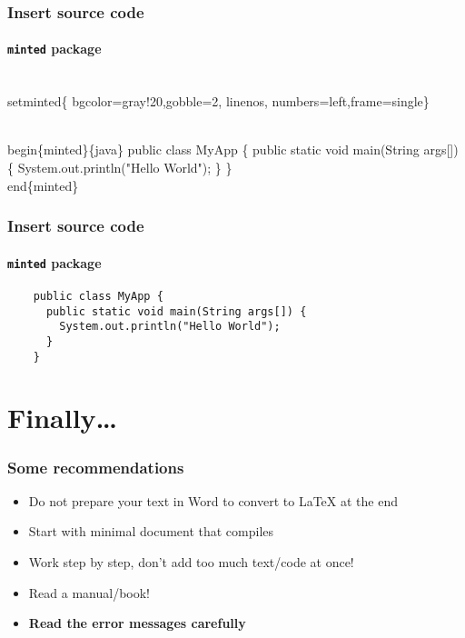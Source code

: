 \documentclass[aspectratio=169]{beamer}
\begin{document}
\begin{frame}[fragile]
 \frametitle{Insert source code}
  \framesubtitle{\texttt{minted} package}

  \begin{semiverbatim}
  \\setminted\{%
    bgcolor=gray!20,gobble=2, linenos,
    numbers=left,frame=single\}

  \\begin\{minted\}\{java\}
    public class MyApp \{
      public static void main(String args[]) \{
        System.out.println("Hello World");
      \}
    \}
  \\end\{minted\}
  \end{semiverbatim}
\end{frame}

\begin{frame}[fragile]
 \frametitle{Insert source code}
  \framesubtitle{\texttt{minted} package}
  \begin{verbatim}
    public class MyApp {
      public static void main(String args[]) {
        System.out.println("Hello World");
      }
    }
  \end{verbatim}
\end{frame}

\section{Finally\ldots}

\begin{frame}
  \frametitle{Some recommendations}

  \begin{itemize}
   \item Do not prepare your text in Word to convert to {\LaTeX} at the end
   \item Start with minimal document that compiles
   \item Work step by step, don't add too much text/code at once!
   \item Read a manual/book!
   \item \textbf{Read the error messages carefully}
  \end{itemize}

\end{frame}
\end{document}
